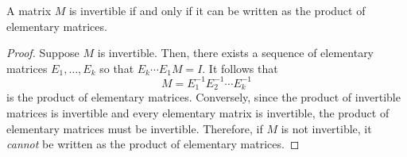 \begin{theorem}
	A matrix $M$ is invertible if and only if it can be written as the product of elementary matrices.
\end{theorem}
\begin{proof}
	Suppose $M$ is invertible. Then, there exists a sequence of elementary matrices $E_1,\ldots,E_k$ so that
	$E_k\cdots E_1M=I$. It follows that
	\[
		M=E_1^{-1}E_2^{-1}\cdots E_k^{-1}
	\]
	is the product of elementary matrices. Conversely, since the product of invertible matrices is invertible
	and every elementary matrix is invertible, the product of elementary matrices must be invertible.
	Therefore, if $M$ is not invertible, it \emph{cannot} be written as the product of elementary matrices.
\end{proof}
